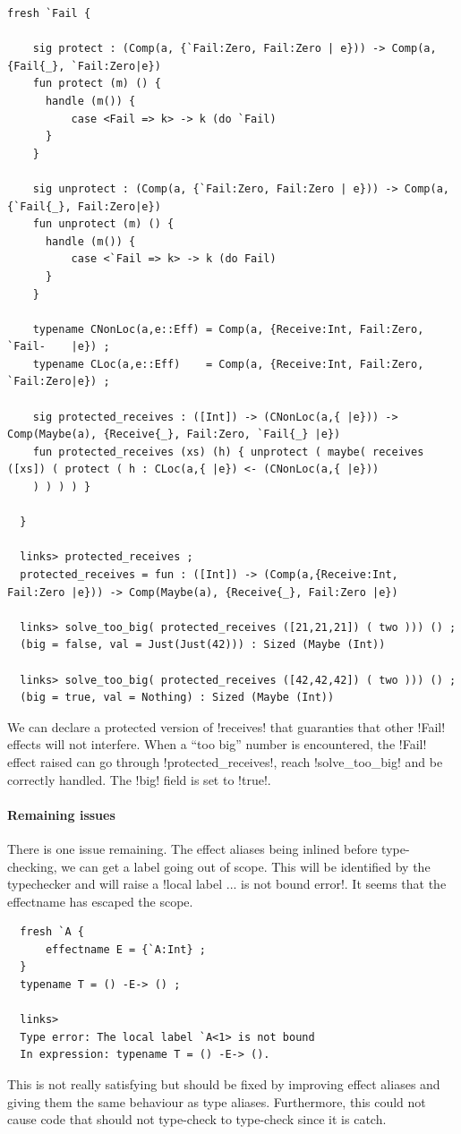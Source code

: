 \documentclass[11pt, nonacm=true, language=french, language=english]{acmart}
\begin{document}
\begin{lstlisting}[caption=Using local effects to avoid pollution]
  fresh `Fail {

    sig protect : (Comp(a, {`Fail:Zero, Fail:Zero | e})) -> Comp(a, {Fail{_}, `Fail:Zero|e})
    fun protect (m) () {
      handle (m()) {
          case <Fail => k> -> k (do `Fail)
      }
    }

    sig unprotect : (Comp(a, {`Fail:Zero, Fail:Zero | e})) -> Comp(a, {`Fail{_}, Fail:Zero|e})
    fun unprotect (m) () {
      handle (m()) {
          case <`Fail => k> -> k (do Fail)
      }
    }

    typename CNonLoc(a,e::Eff) = Comp(a, {Receive:Int, Fail:Zero, `Fail-    |e}) ;
    typename CLoc(a,e::Eff)    = Comp(a, {Receive:Int, Fail:Zero, `Fail:Zero|e}) ;

    sig protected_receives : ([Int]) -> (CNonLoc(a,{ |e})) -> Comp(Maybe(a), {Receive{_}, Fail:Zero, `Fail{_} |e})
    fun protected_receives (xs) (h) { unprotect ( maybe( receives ([xs]) ( protect ( h : CLoc(a,{ |e}) <- (CNonLoc(a,{ |e}))
    ) ) ) ) }

  }

  links> protected_receives ;
  protected_receives = fun : ([Int]) -> (Comp(a,{Receive:Int, Fail:Zero |e})) -> Comp(Maybe(a), {Receive{_}, Fail:Zero |e})

  links> solve_too_big( protected_receives ([21,21,21]) ( two ))) () ;
  (big = false, val = Just(Just(42))) : Sized (Maybe (Int))

  links> solve_too_big( protected_receives ([42,42,42]) ( two ))) () ;
  (big = true, val = Nothing) : Sized (Maybe (Int))
\end{lstlisting}

We can declare a protected version of !receives! that guaranties that other !Fail! effects will not interfere. When a ``too big'' number is encountered, the !Fail! effect raised can go through !protected_receives!, reach !solve_too_big!  and be correctly handled. The !big! field is set to !true!.

\paragraph{Remaining issues}
There is one issue remaining. The effect aliases being inlined before type-checking, we can get a label going out of scope. This will be identified by the typechecker and will raise a !local label ... is not bound error!. It seems that the effectname has escaped the scope.
\begin{lstlisting}
  fresh `A {
      effectname E = {`A:Int} ;
  }
  typename T = () -E-> () ;

  links>
  Type error: The local label `A<1> is not bound
  In expression: typename T = () -E-> ().
\end{lstlisting}
This is not really satisfying but should be fixed by improving effect aliases and giving them the same behaviour as type aliases. Furthermore, this could not cause code that should not type-check to type-check since it is catch.
\end{document}
